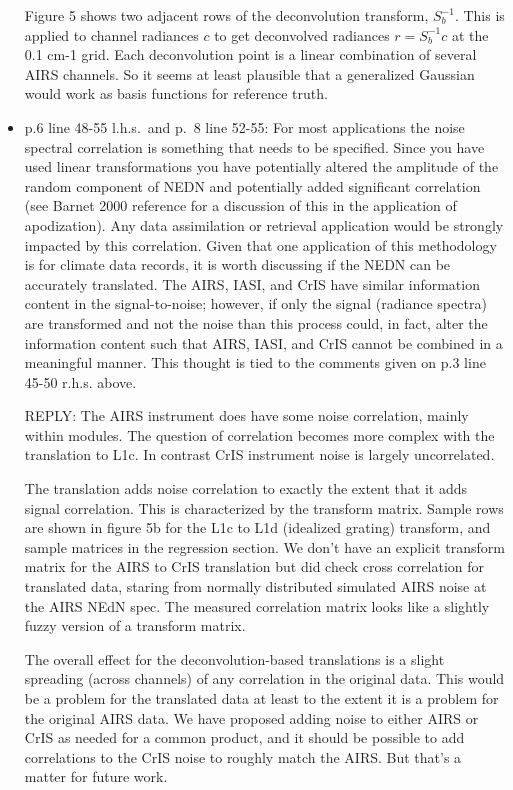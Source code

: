 \documentclass[11pt]{article}
\newcommand {\reply} {\mbox{\small REPLY}}
\begin{document}
\begin{itemize}
  Figure 5 shows two adjacent rows of the deconvolution transform,
  $S_b^{-1}$.  This is applied to channel radiances $c$ to get
  deconvolved radiances $r = S_b^{-1} c$ at the 0.1 cm-1 grid.  Each
  deconvolution point is a linear combination of several AIRS
  channels.  So it seems at least plausible that a generalized
  Gaussian would work as basis functions for reference truth.


\item p.6 line 48-55 l.h.s.~and p.~8 line 52-55: For most
  applications the noise spectral correlation is something that
  needs to be specified.  Since you have used linear transformations
  you have potentially altered the amplitude of the random component
  of NEDN and potentially added significant correlation (see Barnet
  2000 reference for a discussion of this in the application of
  apodization). Any data assimilation or retrieval application would
  be strongly impacted by this correlation. Given that one
  application of this methodology is for climate data records, it is
  worth discussing if the NEDN can be accurately translated.  The
  AIRS, IASI, and CrIS have similar information content in the
  signal-to-noise; however, if only the signal (radiance spectra)
  are transformed and not the noise than this process could, in
  fact, alter the information content such that AIRS, IASI, and CrIS
  cannot be combined in a meaningful manner. This thought is tied to
  the comments given on p.3 line 45-50 r.h.s. above.

  \reply: The AIRS instrument does have some noise correlation,
  mainly within modules.  The question of correlation becomes more
  complex with the translation to L1c.  In contrast CrIS instrument
  noise is largely uncorrelated.

  The translation adds noise correlation to exactly the extent 
  that it adds signal correlation.  This is characterized by the
  transform matrix.  Sample rows are shown in figure 5b for the L1c
  to L1d (idealized grating) transform, and sample matrices in the
  regression section.  We don't have an explicit transform matrix
  for the AIRS to CrIS translation but did check cross correlation
  for translated data, staring from normally distributed simulated
  AIRS noise at the AIRS NEdN spec.  The measured correlation matrix
  looks like a slightly fuzzy version of a transform matrix.

  The overall effect for the deconvolution-based translations is 
  a slight spreading (across channels) of any correlation in the
  original data.  This would be a problem for the translated data at
  least to the extent it is a problem for the original AIRS data.
  We have proposed adding noise to either AIRS or CrIS as needed for
  a common product, and it should be possible to add correlations to
  the CrIS noise to roughly match the AIRS.  But that's a matter for
  future work.


\end{itemize}
\end{document}
